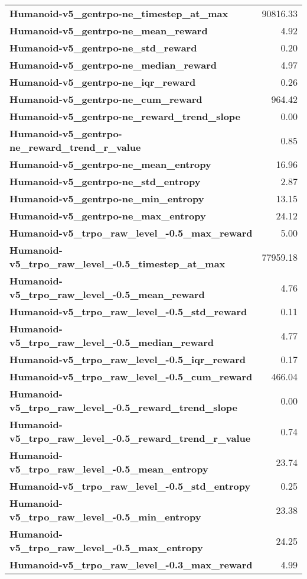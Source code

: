 \begin{tabular}{lr}
\textbf{Humanoid-v5_gentrpo-ne_timestep_at_max} & 90816.33 \\
\textbf{Humanoid-v5_gentrpo-ne_mean_reward} & 4.92 \\
\textbf{Humanoid-v5_gentrpo-ne_std_reward} & 0.20 \\
\textbf{Humanoid-v5_gentrpo-ne_median_reward} & 4.97 \\
\textbf{Humanoid-v5_gentrpo-ne_iqr_reward} & 0.26 \\
\textbf{Humanoid-v5_gentrpo-ne_cum_reward} & 964.42 \\
\textbf{Humanoid-v5_gentrpo-ne_reward_trend_slope} & 0.00 \\
\textbf{Humanoid-v5_gentrpo-ne_reward_trend_r_value} & 0.85 \\
\textbf{Humanoid-v5_gentrpo-ne_mean_entropy} & 16.96 \\
\textbf{Humanoid-v5_gentrpo-ne_std_entropy} & 2.87 \\
\textbf{Humanoid-v5_gentrpo-ne_min_entropy} & 13.15 \\
\textbf{Humanoid-v5_gentrpo-ne_max_entropy} & 24.12 \\
\textbf{Humanoid-v5_trpo_raw_level_-0.5_max_reward} & 5.00 \\
\textbf{Humanoid-v5_trpo_raw_level_-0.5_timestep_at_max} & 77959.18 \\
\textbf{Humanoid-v5_trpo_raw_level_-0.5_mean_reward} & 4.76 \\
\textbf{Humanoid-v5_trpo_raw_level_-0.5_std_reward} & 0.11 \\
\textbf{Humanoid-v5_trpo_raw_level_-0.5_median_reward} & 4.77 \\
\textbf{Humanoid-v5_trpo_raw_level_-0.5_iqr_reward} & 0.17 \\
\textbf{Humanoid-v5_trpo_raw_level_-0.5_cum_reward} & 466.04 \\
\textbf{Humanoid-v5_trpo_raw_level_-0.5_reward_trend_slope} & 0.00 \\
\textbf{Humanoid-v5_trpo_raw_level_-0.5_reward_trend_r_value} & 0.74 \\
\textbf{Humanoid-v5_trpo_raw_level_-0.5_mean_entropy} & 23.74 \\
\textbf{Humanoid-v5_trpo_raw_level_-0.5_std_entropy} & 0.25 \\
\textbf{Humanoid-v5_trpo_raw_level_-0.5_min_entropy} & 23.38 \\
\textbf{Humanoid-v5_trpo_raw_level_-0.5_max_entropy} & 24.25 \\
\textbf{Humanoid-v5_trpo_raw_level_-0.3_max_reward} & 4.99 \\

\end{tabular}
